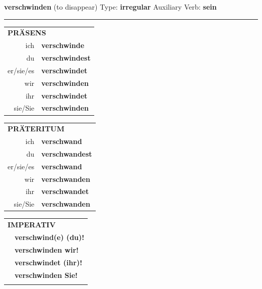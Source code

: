 \documentclass[10pt,a4paper]{revtex4-2}
\begin{document}
\begin{verbbox}
    {\Large \bf verschwinden} (to disappear) \hfill Type: \textbf{irregular} \hfill Auxiliary Verb: \textbf{sein} 
    
     \vspace{5pt}

    \hrule
    
    \vspace{5pt}

  \begin{tabular}{rl}
     \multicolumn{2}{l}{\textbf{PRÄSENS} }\\
    ich & \textbf{verschwinde}\\
    du & \textbf{verschwindest}\\
    er/sie/es & \textbf{verschwindet}\\
    wir & \textbf{verschwinden}\\
    ihr & \textbf{verschwindet}\\
    sie/Sie & \textbf{verschwinden}\\
  \end{tabular}
  \hfill
     \begin{tabular}{rl}
    \multicolumn{2}{l}{\textbf{PRÄTERITUM} }\\
    ich & \textbf{verschwand}\\
    du & \textbf{verschwandest}\\
    er/sie/es & \textbf{verschwand}\\
    wir & \textbf{verschwanden}\\
    ihr & \textbf{verschwandet}\\
    sie/Sie & \textbf{verschwanden}\\
  \end{tabular}
  \hfill
  \begin{tabular}{rl}
     \multicolumn{2}{l}{\textbf{IMPERATIV} }\\
   & \textbf{verschwind(e) (du)!}\\
   & \textbf{verschwinden wir!}\\
   & \textbf{verschwindet (ihr)!}\\
   & \textbf{verschwinden Sie!}\\
   & \vspace{10pt}
  \end{tabular}

    \vspace{10pt}


\end{verbbox}
\end{document}
